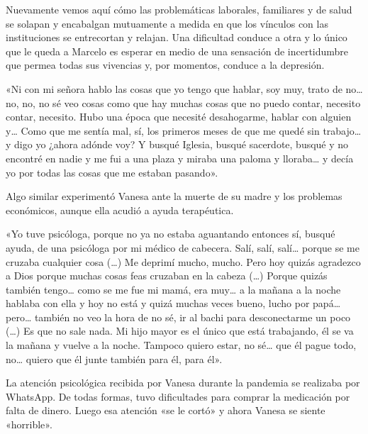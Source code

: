 \begin{refsection}
Nuevamente vemos aquí cómo las problemáticas laborales, familiares y de salud se solapan y encabalgan mutuamente a medida en que los vínculos con las instituciones se entrecortan y relajan. Una dificultad conduce a otra y lo único que le queda a Marcelo es esperar en medio de una sensación de incertidumbre que permea todas sus vivencias y, por momentos, conduce a la depresión.


\begin{gbcita}
«Ni con mi señora hablo las cosas que yo tengo que hablar, soy muy, trato de no… no, no, no sé veo cosas como que hay muchas cosas que no puedo contar, necesito contar, necesito. Hubo una época que necesité desahogarme, hablar con alguien y… Como que me sentía mal, sí, los primeros meses de que me quedé sin trabajo… y digo yo ¿ahora adónde voy? Y busqué Iglesia, busqué sacerdote, busqué y no encontré en nadie y me fui a una plaza y miraba una paloma y lloraba… y decía yo por todas las cosas que me estaban pasando».

\end{gbcita}

Algo similar experimentó Vanesa ante la muerte de su madre y los problemas económicos, aunque ella acudió a ayuda terapéutica.


\begin{gbcita}
«Yo tuve psicóloga, porque no ya no estaba aguantando entonces sí, busqué ayuda, de una psicóloga por mi médico de cabecera. Salí, salí, salí… porque se me cruzaba cualquier cosa (…) Me deprimí mucho, mucho. Pero hoy quizás agradezco a Dios porque muchas cosas feas cruzaban en la cabeza (…) Porque quizás también tengo… como se me fue mi mamá, era muy… a la mañana a la noche hablaba con ella y hoy no está y quizá muchas veces bueno, lucho por papá… pero… también no veo la hora de no sé, ir al bachi para desconectarme un poco (…) Es que no sale nada. Mi hijo mayor es el único que está trabajando, él se va la mañana y vuelve a la noche. Tampoco quiero estar, no sé… que él pague todo, no… quiero que él junte también para él, para él».

\end{gbcita}

La atención psicológica recibida por Vanesa durante la pandemia se realizaba por WhatsApp. De todas formas, tuvo dificultades para comprar la medicación por falta de dinero. Luego esa atención «se le cortó» y ahora Vanesa se siente «horrible».



\end{refsection}
